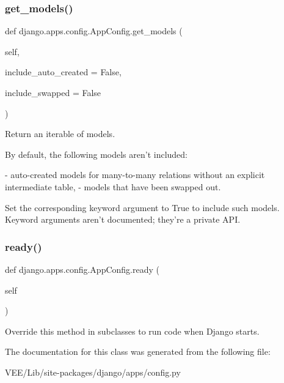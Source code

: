 \subsubsection{\texorpdfstring{get\+\_\+models()}{get\_models()}}
{\footnotesize\ttfamily def django.\+apps.\+config.\+App\+Config.\+get\+\_\+models (\begin{DoxyParamCaption}\item[{}]{self,  }\item[{}]{include\+\_\+auto\+\_\+created = {\ttfamily False},  }\item[{}]{include\+\_\+swapped = {\ttfamily False} }\end{DoxyParamCaption})}

\begin{DoxyVerb}Return an iterable of models.

By default, the following models aren't included:

- auto-created models for many-to-many relations without
  an explicit intermediate table,
- models that have been swapped out.

Set the corresponding keyword argument to True to include such models.
Keyword arguments aren't documented; they're a private API.
\end{DoxyVerb}
 \mbox{\label{classdjango_1_1apps_1_1config_1_1_app_config_ad5bacbb21829def59d64ab6c4fd23e7d}} 
\subsubsection{\texorpdfstring{ready()}{ready()}}
{\footnotesize\ttfamily def django.\+apps.\+config.\+App\+Config.\+ready (\begin{DoxyParamCaption}\item[{}]{self }\end{DoxyParamCaption})}

\begin{DoxyVerb}Override this method in subclasses to run code when Django starts.
\end{DoxyVerb}
 

The documentation for this class was generated from the following file\+:\begin{DoxyCompactItemize}
\item 
V\+E\+E/\+Lib/site-\/packages/django/apps/config.\+py\end{DoxyCompactItemize}
